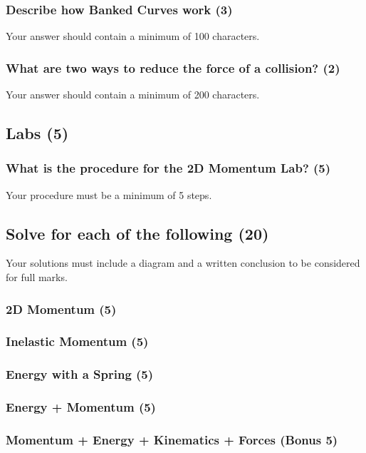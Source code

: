 \documentclass{article}
\begin{document}
\subsubsection{Describe how Banked Curves work (3)}
Your answer should contain a minimum of 100 characters.

\subsubsection{What are two ways to reduce the force of a collision? (2)}
Your answer should contain a minimum of 200 characters.

\subsection{Labs (5)}
\subsubsection{What is the procedure for the 2D Momentum Lab? (5)}
Your procedure must be a minimum of 5 steps.

\subsection{Solve for each of the following (20)}
Your solutions must include a diagram and a written conclusion to be considered for full marks.

\subsubsection{2D Momentum (5)}
\subsubsection{Inelastic Momentum (5)}
\subsubsection{Energy with a Spring (5)}
\subsubsection{Energy + Momentum (5)}
\subsubsection{Momentum + Energy + Kinematics + Forces (Bonus 5)}



\end{document}
